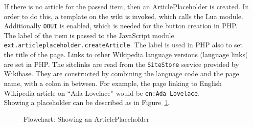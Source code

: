 If there is no article for the passed item, then an ArticlePlaceholder is created. In order to do this, a template on the wiki is invoked, which calls the Lua module. Additionally \texttt{\justify OOUI} is enabled, which is needed for the button creation in PHP. The label of the item is passed to the JavaScript module \texttt{\justify ext.articleplaceholder.createArticle}. The label is used in PHP also to set the title of the page. Links to other Wikipedia language versions (language links) are set in PHP. The sitelinks are read from the \texttt{\justify SiteStore} service provided by Wikibase. They are constructed by combining the language code and the page name, with a colon in between. For example, the page linking to English Wikipedia article on ``Ada Lovelace'' would be \texttt{\justify en:Ada Lovelace}.\\
Showing a placeholder can be described as in Figure~\ref{fig:showpl}. 
\begin{figure}[H]
	\centering
	
	\caption{Flowchart: Showing an ArticlePlaceholder}
	\label{fig:showpl}
\end{figure}
